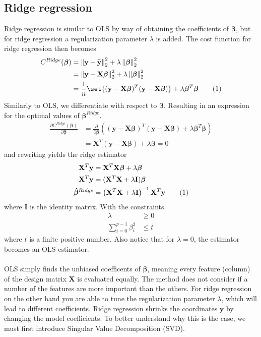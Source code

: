 \documentclass[a4paper,twocolumn]{article}
\DeclarePairedDelimiter\set\{\}
\newcommand\numberthis{\addtocounter{equation}{1}\tag{\theequation}}
\newcommand{\y}{\mathbf{y}}
\newcommand{\ytilde}{\mathbf{\widetilde{y}}}
\newcommand{\X}{\mathbf{X}}
\newcommand{\B}{\boldsymbol{\beta}}
\newcommand{\Bhat}{\boldsymbol{\hat{\beta}}}
\newcommand{\norm}[1]{\left\lVert#1\right\rVert}
\begin{document}
\subsection{Ridge regression}
Ridge regression is similar to OLS by way of obtaining the coefficients of $\B$, but for ridge regression a regularization parameter $\lambda$ is added. The cost function for ridge regression then becomes
\begin{align*}
    C^{Ridge}(\B) &= \norm{\y - \ytilde}_{2}^{2} + \lambda\norm{\B}_{2}^{2}\\
    &= \norm{\y - \X\B}_{2}^{2} + \lambda\norm{\B}_{2}^{2}\\
    &= \frac{1}{n}\set{(\y - \X\B)^{T}(\y - \X\B)} + \lambda\B^{T}\B \numberthis\label{eqn}
\end{align*}
Similarly to OLS, we differentiate with respect to $\B$. Resulting in an expression for the optimal values of $\B^{Ridge}$.
\begin{align*}
    \frac{\partial C^{Ridge}(\B)}{\partial \B} &= \frac{\partial}{\partial \B}\left((\y - \X\B)^{T}(\y - \X\B) + \lambda\B^{T}\B\right)\\
    &= \X^{T}(\y - \X\B) + \lambda\B = 0
\end{align*}
and rewriting yields the ridge estimator
\begin{align*}
    \X^{T}\y &= \X^{T}\X\B + \lambda\B\\
    \X^{T}\y &= (\X^{T}\X + \lambda \mathbf{I})\B\\
    \Bhat^{Ridge} &= \left(\X^{T}\X + \lambda \mathbf{I}\right)^{-1}\X^{T}\y \numberthis\label{eqn}
\end{align*}
where $\mathbf{I}$ is the identity matrix. With the constraints
\begin{align*}
    \lambda &\geq 0\\
    \sum_{i=0}^{p-1}\beta_{i}^{2} &\leq t
\end{align*}
where $t$ is a finite positive number. Also notice that for $\lambda = 0$, the estimator becomes an OLS estimator. \\
\\
OLS simply finds the unbiased coefficents of $\B$, meaning every feature (column) of the design matrix $\X$ is evaluated equally. The method does not consider if a number of the features are more important than the others. For ridge regression on the other hand you are able to tune the regularization parameter $\lambda$, which will lead to different coefficients. Ridge regression shrinks the coordinates $\y$ by changing the model coefficients\cite{ridge1, ridge2}. To better understand why this is the case, we must first introduce Singular Value Decomposition (SVD).
\end{document}
